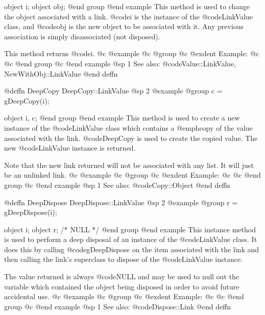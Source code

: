 object  i;
object  obj;
@end group
@end example
This method is used to change the object associated with a link.
@code{i} is the instance of the @code{LinkValue} class, and
@code{obj} is the new object to be associated with it.
Any previous association is simply disassociated (not disposed).

This method returns @code{i}.
@c @example
@c @group
@c @exdent Example:
@c 
@c @end group
@c @end example
@sp 1
See also:  @code{Value::LinkValue, NewWithObj::LinkValue}
@end deffn











@deffn {DeepCopy} DeepCopy::LinkValue
@sp 2
@example
@group
c = gDeepCopy(i);

object  i, c;
@end group
@end example
This method is used to create a new instance of the @code{LinkValue} class
which contains a @emph{copy} of the value associated with the link.
@code{DeepCopy} is used to create the copied value.
The new @code{LinkValue} instance is returned.

Note that the new link returned will not be associated with any list.
It will just be an unlinked link.
@c @example
@c @group
@c @exdent Example:
@c 
@c @end group
@c @end example
@sp 1
See also:  @code{Copy::Object}
@end deffn











@deffn {DeepDispose} DeepDispose::LinkValue
@sp 2
@example
@group
r = gDeepDispose(i);

object  i;
object  r;     /*  NULL  */
@end group
@end example
This instance method is used to perform a deep disposal of an instance
of the @code{LinkValue} class.  It does this by calling @code{gDeepDispose}
on the item associated with the link and then calling the link's
superclass to dispose of the @code{LinkValue} instance.

The value returned is always @code{NULL} and may be used to null out
the variable which contained the object being disposed in order to
avoid future accidental use.
@c @example
@c @group
@c @exdent Example:
@c 
@c @end group
@c @end example
@sp 1
See also:  @code{Dispose::Link}
@end deffn








